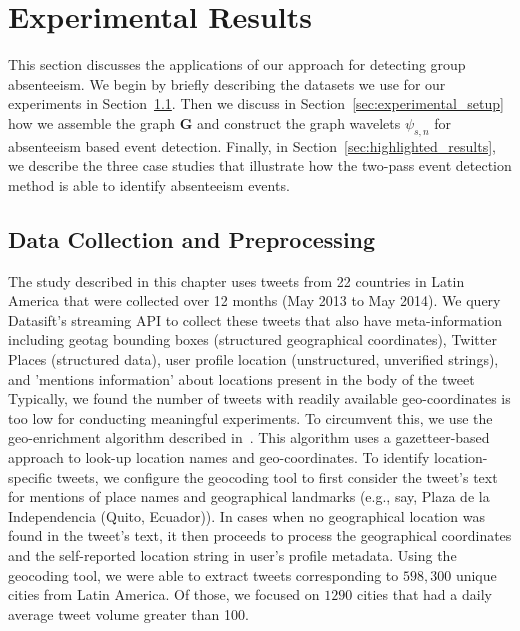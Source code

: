 \section{Experimental Results} \label{sec:experiment}
This section discusses the applications of our approach for detecting group absenteeism.
We begin by briefly describing the datasets we use for our experiments in Section~\ref{sec:data_collection}.
Then we discuss in Section~\ref{sec:experimental_setup} how we assemble the graph $\mathbf{G}$ and construct the graph wavelets $\psi_{s,n}$ for absenteeism based event detection.
Finally, in Section~\ref{sec:highlighted_results}, we describe the three case studies that illustrate how the two-pass event detection method is able to identify  absenteeism events.
\subsection{Data Collection and Preprocessing}
\label{sec:data_collection}
The study described in this chapter uses tweets from 22 countries in Latin America that were collected over 12 months (May 2013 to May 2014).
We query Datasift's streaming API to collect these tweets that also have meta-information including geotag bounding boxes (structured geographical coordinates), Twitter Places (structured data), user profile location (unstructured, unverified strings), and 'mentions information' about locations present in the body of the tweet
Typically, we found the number of tweets with readily available geo-coordinates is too low for conducting meaningful experiments.
To circumvent this, we use the geo-enrichment algorithm described in~\cite{ramakrishnan2014beating}.
This algorithm uses a gazetteer-based approach to look-up location names and geo-coordinates.
To identify  location-specific tweets, we configure the geocoding tool to first consider the tweet's text for mentions of place names and geographical landmarks (e.g., say, Plaza de la Independencia (Quito, Ecuador)).
In cases when no geographical location was found in the tweet's text, it then proceeds to process the geographical coordinates and the self-reported location string in user's profile metadata.
Using the geocoding tool, we were able to extract tweets corresponding to $598,300$ unique cities from Latin America.
Of those, we focused on $1290$ cities that had a daily average tweet volume greater than 100.

